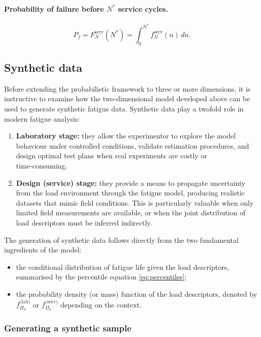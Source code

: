 \paragraph{Probability of failure before $N^*$ service cycles.}
\begin{equation}
P_f = F_N^{\mathrm{serv}}(N^*) = \int_0^{N^*} f_N^{\mathrm{serv}}(n)\,dn.
\label{eq:pf}
\end{equation}

\subsection{Synthetic data}
\label{sec:synthetic-data}
Before extending the probabilistic framework to three or more dimensions, it is instructive to examine how the two‑dimensional model developed above can be used to generate synthetic fatigue data. Synthetic data play a twofold role in modern fatigue analysis:

\begin{enumerate}
    \item \textbf{Laboratory stage:} they allow the experimenter to explore the model behaviour under controlled conditions, validate estimation procedures, and design optimal test plans when real experiments are costly or time‑consuming.
    \item \textbf{Design (service) stage:} they provide a means to propagate uncertainty from the load environment through the fatigue model, producing realistic datasets that mimic field conditions. This is particularly valuable when only limited field measurements are available, or when the joint distribution of load descriptors must be inferred indirectly.
\end{enumerate}

The generation of synthetic data follows directly from the two fundamental ingredients of the model:
\begin{itemize}
    \item the conditional distribution of fatigue life given the load descriptors, summarised by the percentile equation \eqref{eq:percentiles};
    \item the probability density (or mass) function of the load descriptors, denoted by \(f_{\Pi_2}^{\text{(lab)}}\) or \(f_{\Pi_2}^{\text{(serv)}}\) depending on the context.
\end{itemize}

\subsubsection{Generating a synthetic sample}

